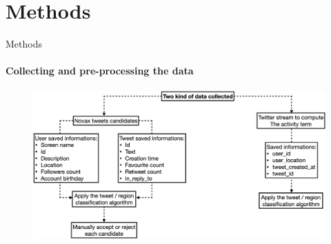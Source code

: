 \documentclass[9pt]{beamer}
\begin{document}
	
	\section{Methods}
	
	\begin{frame}{Methods}
	\framesubtitle{Collecting and pre-processing the data}
    \begin{figure}[t]
	    \begin{minipage}[l]{1\columnwidth}
	    \centering
	    \includegraphics[width=1\textwidth]{images/schema2.png}
        \label{fig:}
        \end{minipage}
    \end{figure}
	\end{frame}
	
\end{document}
